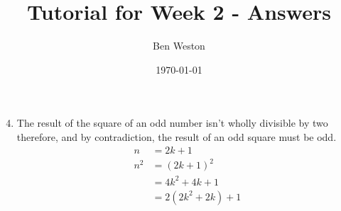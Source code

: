 \documentclass{article}
\title{Tutorial for Week 2 - Answers}
\author{Ben Weston}
\date{\today}
\begin{document}
\maketitle
\begin{enumerate} \setcounter{enumi}{3}
	\item{
		The result of the square of an odd number isn't wholly divisible by two therefore, and by contradiction, the result of an odd square must be odd.
		\begin{align*}
			n &= 2k+1\\
			n^2 &=(2k+1)^2\\
			    &=4k^2+4k+1\\
			    &=2(2k^2+2k)+1
		\end{align*}

		}
\end{enumerate}
\end{document}
